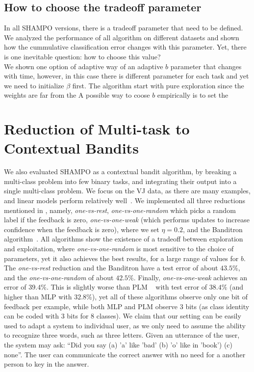 \subsection{How to choose the tradeoff parameter}
In all SHAMPO versions, there is a tradeoff parameter that need to be defined.  We analyzed the performance 
of all algorithm on different datasets and shown how the cummulative classification error changes with this
parameter. Yet, there is one inevitable question: how to choose this value?\\
We shown one option of adaptive way of an adaptive $b$ parameter that changes 
with time, however, in this case there is different parameter for each task and 
yet we need to initialize $\beta$ first. 
The algorithm start with pure exploration since the weights are far from the 
A possible way to coose $b$ empirically is to set the 



\section{Reduction of Multi-task to Contextual Bandits}


We also evaluated SHAMPO as a contextual bandit algorithm, by breaking a multi-class problem into few 
binary tasks, and integrating their output into a single multi-class problem. 
We focus on the VJ data, as there are many examples, and linear models perform relatively 
well~\cite{lin2009lose}.  We implemented all three reductions
mentioned in , namely, {\em one-vs-rest}, {\em one-vs-one-random} which picks a 
random label if the feedback is zero, {\em one-vs-one-weak} (which performs updates to increase 
confidence when the feedback is zero), where we set $\eta=0.2$, and the 
Banditron algorithm~\cite{kakade2008efficient}.
All algorithms show the existence of a tradeoff between exploration and exploitation, 
where {\em one-vs-one-random} is most sensitive to the choice of parameters, yet it also achieves the best 
results, for a large range of values for $b$.
The  {\em one-vs-rest} reduction and the Banditron have a test error of about $43.5\%$, and the 
{\em one-vs-one-random} of about $42.5\%$.
Finally, {\em one-vs-one-weak} achieves an error of $39.4\%$.
 This is slightly worse than PLM
~\cite{lin2009lose} with test error of $38.4\%$ (and higher than MLP with $32.8\%$), 
yet all of these algorithms observe only one bit of feedback per example, while both MLP and PLM 
observe $3$ bits (as class identity can be coded with $3$ bits for $8$ classes). We claim that our setting 
can be easily used to adapt a system to individual user, as we only need to assume the ability to recognize 
three words, such as three letters. Given an utterance of the user, the system may ask: 
``Did you say (a) 'a' like 'bad' (b) 'o' like in 'book') (c) none''. The user can communicate the correct answer 
with no need for a another person to key in the answer.

